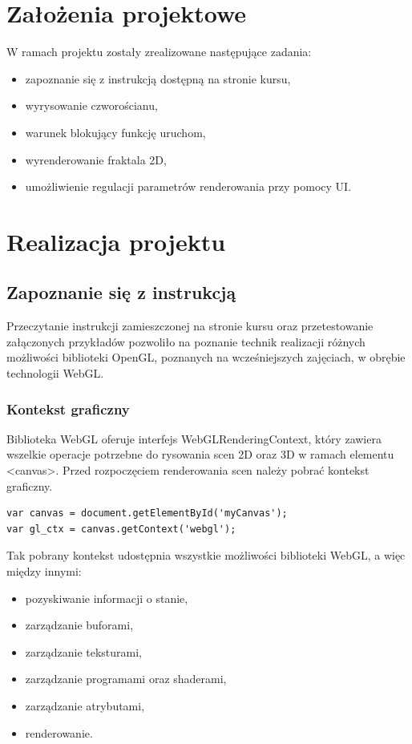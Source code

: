 \documentclass[a4paper,11pt]{article}
\begin{document}
\section{Założenia projektowe}

W ramach projektu zostały zrealizowane następujące zadania:
\begin{itemize}
\item zapoznanie się z instrukcją dostępną na stronie kursu,
\item wyrysowanie czworościanu,
\item warunek blokujący funkcję uruchom,
\item wyrenderowanie fraktala 2D,
\item umożliwienie regulacji parametrów renderowania przy pomocy UI.
\end{itemize}

\section{Realizacja projektu}

\subsection{Zapoznanie się z instrukcją}

Przeczytanie instrukcji zamieszczonej na stronie kursu oraz przetestowanie załączonych przykładów pozwoliło na poznanie technik realizacji różnych możliwości biblioteki OpenGL, poznanych na wcześniejszych zajęciach, w obrębie technologii WebGL. 

\subsubsection {Kontekst graficzny}

Biblioteka WebGL oferuje interfejs WebGLRenderingContext, który zawiera wszelkie operacje potrzebne do rysowania scen 2D oraz 3D w ramach elementu <canvas>. Przed rozpoczęciem renderowania scen należy pobrać kontekst graficzny.

\begin{lstlisting}[caption= Pobranie kontekstu graficznego]
var canvas = document.getElementById('myCanvas');
var gl_ctx = canvas.getContext('webgl');
\end{lstlisting}

Tak pobrany kontekst udostępnia wszystkie możliwości biblioteki WebGL, a więc między innymi:
\begin{itemize}
\item pozyskiwanie informacji o stanie,
\item zarządzanie buforami,
\item zarządzanie teksturami,
\item zarządzanie programami oraz shaderami,
\item zarządzanie atrybutami,
\item renderowanie.
\end{itemize}
\end{document}
